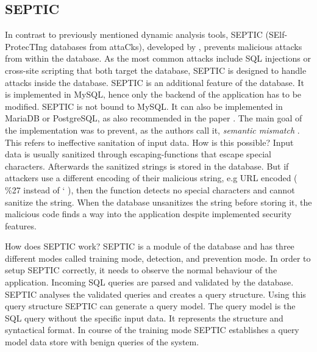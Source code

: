 \subsection{SEPTIC}
In contrast to previously mentioned dynamic analysis tools, SEPTIC (SElf-ProtecTIng databases from attaCks), developed by \textcite[]{Medeiros2019}, prevents malicious attacks from within the database. As the most common attacks include SQL injections or cross-site scripting that both target the database, SEPTIC is designed to handle attacks inside the database. SEPTIC is an additional feature of the database. It is implemented in MySQL, hence only the backend of the application has to be modified. SEPTIC is not bound to MySQL. It can also be implemented in MariaDB or PostgreSQL, as also recommended in the paper \autocite[1185]{Medeiros2019}.\newline
The main goal of the implementation was to prevent, as the authors call it, \textit{semantic mismatch} \autocite[1168]{Medeiros2019}. This refers to ineffective sanitation of input data. How is this possible? Input data is usually sanitized through escaping-functions that escape special characters. Afterwards the sanitized strings is stored in the database. But if attackers use a different encoding of their malicious string, e.g URL encoded ( \%27 instead of ` ), then the function detects no special characters and cannot sanitize the string. When the database unsanitizes the string before storing it, the malicious code finds a way into the application despite implemented security features.\newline


How does SEPTIC work? SEPTIC is a module of the database and has three different modes called training mode, detection, and prevention mode. In order to setup SEPTIC correctly, it needs to observe the normal behaviour of the application. Incoming SQL queries are parsed and validated by the database. SEPTIC analyses the validated queries and creates a query structure. Using this query structure SEPTIC can generate a query model. The query model is the SQL query without the specific input data. It represents the structure and syntactical format. In course of the training mode SEPTIC establishes a query model data store with benign queries of the system\autocite[1169-1172]{Medeiros2019}.\newline



